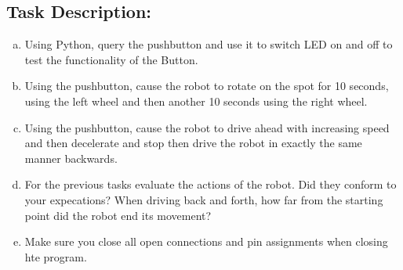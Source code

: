 

\subsection*{\Large Task Description:}
     \begin{enumerate}[a)]
        \item Using Python, query the pushbutton and use it to switch LED on and off to test the functionality of the Button. 
        \item Using the pushbutton, cause the robot to rotate on the spot for 10 seconds, using the left wheel and then another 10 seconds using the right wheel.
        
        \item Using the pushbutton, cause the robot to drive ahead with increasing speed and then decelerate and stop then drive the robot in exactly the same manner backwards. 
        
        \item For the previous tasks evaluate the actions of the robot. Did they conform to your expecations? When driving back and forth, how far from the starting point did the robot end its movement?
        
        \item Make sure you close all open connections and pin assignments when closing hte program. 
    \end{enumerate}